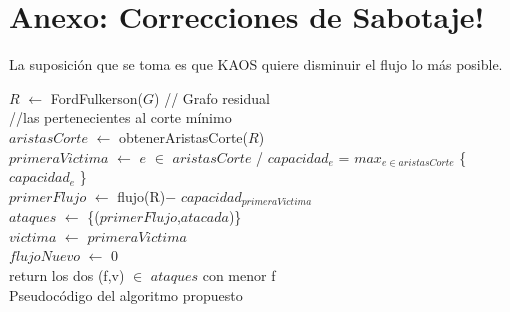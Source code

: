 \documentclass{article}
\begin{document}
\part{Anexo: Correcciones de Sabotaje!}
La suposición que se toma es que KAOS quiere disminuir el flujo lo más posible.
\begin{algorithm}
    \BlankLine

    $R$ $\leftarrow$ FordFulkerson($G$) // Grafo residual \\
    //las pertenecientes al corte mínimo \\
    $aristasCorte$ $\leftarrow$ obtenerAristasCorte($R$) \\
    $primeraVictima$ $\leftarrow$ $e$ $\in$ $aristasCorte$ / $capacidad_e$ = $max_{e \in aristasCorte}$ \{ $capacidad_e$ \} \\
    $primerFlujo$ $\leftarrow$ flujo(R)$-$ $capacidad_{primeraVictima}$ \\
    $ataques$ $\leftarrow$ \{($primerFlujo$,$atacada$)\}\\
    $victima$ $\leftarrow$ $primeraVictima$ \\
    \BlankLine
    $flujoNuevo$ $\leftarrow$ 0\\
    \BlankLine
    return los dos (f,v) $\in$ $ataques$ con menor f \\

    \caption{Pseudocódigo del algoritmo propuesto}
\end{algorithm}
\end{document}
